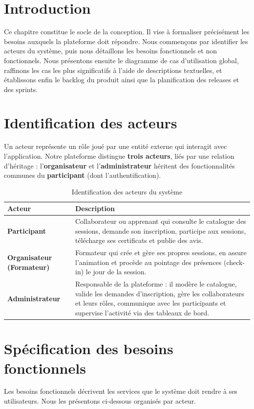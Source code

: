 \documentclass[12pt,a4paper,oneside]{report}
\begin{document}
\section*{Introduction}
Ce chapitre constitue le socle de la conception. Il vise à formaliser précisément les besoins
auxquels la plateforme doit répondre. Nous commençons par identifier les acteurs du système,
puis nous détaillons les besoins fonctionnels et non fonctionnels. Nous présentons ensuite le
diagramme de cas d'utilisation global, raffinons les cas les plus significatifs à l'aide de
descriptions textuelles, et établissons enfin le backlog du produit ainsi que la planification
des releases et des sprints.

\section{Identification des acteurs}
Un acteur représente un rôle joué par une entité externe qui interagit avec l'application.
Notre plateforme distingue \textbf{trois acteurs}, liés par une relation d'héritage :
l'\textbf{organisateur} et l'\textbf{administrateur} héritent des fonctionnalités communes du
\textbf{participant} (dont l'authentification).

\begin{table}[H]\centering\renewcommand{\arraystretch}{1.3}
\begin{tabular}{|p{3.2cm}|p{10.5cm}|}\hline
\rowcolor{gray!15}\textbf{Acteur} & \textbf{Description} \\ \hline
\textbf{Participant} & Collaborateur ou apprenant qui consulte le catalogue des sessions,
demande son inscription, participe aux sessions, télécharge ses certificats et publie des
avis. \\ \hline
\textbf{Organisateur (Formateur)} & Formateur qui crée et gère ses propres sessions, en assure
l'animation et procède au pointage des présences (check-in) le jour de la session. \\ \hline
\textbf{Administrateur} & Responsable de la plateforme : il modère le catalogue, valide les
demandes d'inscription, gère les collaborateurs et leurs rôles, communique avec les
participants et supervise l'activité via des tableaux de bord. \\ \hline
\end{tabular}
\caption{Identification des acteurs du système}\label{tab:acteurs}
\end{table}

\section{Spécification des besoins fonctionnels}
Les besoins fonctionnels décrivent les services que le système doit rendre à ses utilisateurs.
Nous les présentons ci-dessous organisés par acteur.
\end{document}
